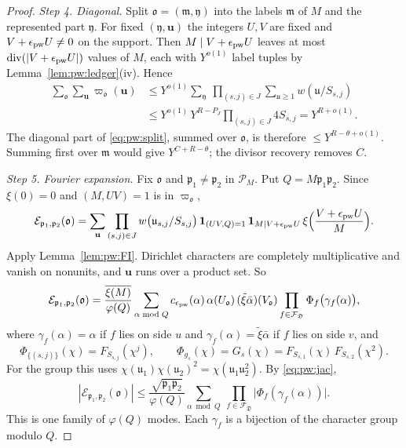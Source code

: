 \documentclass{amsart}
\theoremstyle{definition}
\theoremstyle{plain}
\numberwithin{equation}{section}
\numberwithin{table}{section}
\begin{document}
\begin{proof}
\emph{Step 4. Diagonal.} Split $\mathfrak o=(\mathfrak m,\mathfrak y)$ into the
labels $\mathfrak m$ of $M$ and the represented part $\mathfrak y$. For fixed
$(\mathfrak y,\mathbf u)$ the integers $U,V$ are fixed and
$V+\epsilon_{\rm pw} U\ne0$ on the support. Then
$M\mid V+\epsilon_{\rm pw} U$ leaves at most
$\operatorname{div}(|V+\epsilon_{\rm pw} U|)$ values of $M$, each with $Y^{o(1)}$ label
tuples by Lemma~\ref{lem:pw:ledger}(iv). Hence
\[
 \begin{aligned}
 \sum_{\mathfrak o}\sum_{\mathbf u}\varpi_{\mathfrak o}(\mathbf u)
 &\le Y^{o(1)}\sum_{\mathfrak y}\ \prod_{(s,j)\in J}\sum_{\mathfrak u\ge1}w(\mathfrak u/S_{s,j})\\
 &\le Y^{o(1)}\,Y^{R-P_J}\prod_{(s,j)\in J}4S_{s,j}=Y^{R+o(1)} .
 \end{aligned}
\]
The diagonal part of \eqref{eq:pw:split}, summed over $\mathfrak o$, is
therefore $\le Y^{R-\theta+o(1)}$. Summing first over $\mathfrak m$ would give
$Y^{C+R-\theta}$; the divisor recovery removes $C$.

\emph{Step 5. Fourier expansion.} Fix $\mathfrak o$ and
$\mathfrak p_1\ne\mathfrak p_2$ in $\mathcal P_M$. Put
$Q=M\mathfrak p_1\mathfrak p_2$. Since $\xi(0)=0$ and $(M,UV)=1$ is in
$\varpi_{\mathfrak o}$,
\[
 \mathcal E_{\mathfrak p_1,\mathfrak p_2}(\mathfrak o)=\sum_{\mathbf u}
 \prod_{(s,j)\in J}w\bigl(\mathfrak u_{s,j}/S_{s,j}\bigr)\,
 \mathbf 1_{(UV,Q)=1}\,\mathbf 1_{M\mid V+\epsilon_{\rm pw} U}\,
 \xi\Bigl(\frac{V+\epsilon_{\rm pw} U}M\Bigr).
\]
Apply Lemma~\ref{lem:pw:FI}. Dirichlet characters are completely
multiplicative and vanish on nonunits, and $\mathbf u$ runs over a product
set. So
\begin{equation}\label{eq:pw:E}
 \mathcal E_{\mathfrak p_1,\mathfrak p_2}(\mathfrak o)=\frac{\overline{\xi(M)}}{\varphi(Q)}
 \sum_{\alpha\bmod Q}c_{\epsilon_{\rm pw}}(\alpha)\,
 \alpha(U_{\mathfrak o})\,(\tilde\xi\bar\alpha)(V_{\mathfrak o})
 \prod_{f\in\mathcal F_{\mathfrak D}}\Phi_f\bigl(\gamma_f(\alpha)\bigr),
\end{equation}
where $\gamma_f(\alpha)=\alpha$ if $f$ lies on side $u$ and
$\gamma_f(\alpha)=\tilde\xi\bar\alpha$ if $f$ lies on side $v$, and
\[
 \Phi_{\{(s,j)\}}(\chi)=F_{S_{s,j}}(\chi^j),\qquad
 \Phi_{g_s}(\chi)=G_s(\chi)=F_{S_{s,1}}(\chi)\,F_{S_{s,2}}(\chi^2).
\]
For the group this uses $\chi(\mathfrak u_1)\chi(\mathfrak u_2)^2
=\chi(\mathfrak u_1\mathfrak u_2^2)$. By \eqref{eq:pw:jac},
\begin{equation}\label{eq:pw:Ebound}
 |\mathcal E_{\mathfrak p_1,\mathfrak p_2}(\mathfrak o)|\le
\frac{\sqrt{\mathfrak p_1\mathfrak p_2}}{\varphi(Q)}
 \sum_{\alpha\bmod Q}\ \prod_{f\in\mathcal F_{\mathfrak D}}
 \bigl|\Phi_f(\gamma_f(\alpha))\bigr| .
\end{equation}
This is one family of $\varphi(Q)$ modes. Each $\gamma_f$ is a bijection of the
character group modulo $Q$.


\end{proof}
\end{document}
